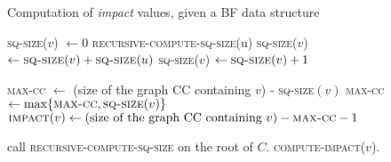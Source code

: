 \documentclass{llncs}
\begin{document}
\begin{algorithm}[H]
		  \small
		  \caption{\small Computation of \emph{impact} values, given a BF data structure}
		  \label{algo:impacts}
		  \begin{algorithmic}[1]
		    \State \textsc{sq-size}($v$) $\gets 0$
		    	\State \textsc{recursive-compute-sq-size}(u)
		    	 \State \textsc{sq-size}($v$) $\gets \textsc{sq-size}(v) + \textsc{sq-size}(u)$
		    \EndFor
		    	\State \textsc{sq-size}($v$) $\gets \textsc{sq-size}(v) + 1$
		    \EndIf
		    \EndProcedure
		  \end{algorithmic}\vspace{5mm}
		  
		  \begin{algorithmic}[1]

			    \State \textsc{max-cc} $\gets $ (size of the graph CC containing $v$) - \textsc{sq-size}$(v)$
			    	 \State \textsc{max-cc} $\gets \max\{\textsc{max-cc}, \textsc{sq-size}(v)\}$
			    \EndFor
			    \State $\textsc{impact}(v) \gets \text{(size of the graph CC containing $v$)} - \textsc{max-cc} - 1$

		    \EndProcedure
		  \end{algorithmic}\vspace{5mm}
		  
		  \begin{algorithmic}[1]
		    	\State call \textsc{recursive-compute-sq-size} on the root of $C$.
		    \EndFor
		    	\State \textsc{compute-impact}($v$).
		    \EndFor
		    \EndProcedure
		  \end{algorithmic}
		\end{algorithm}

\fi 
\end{document}
